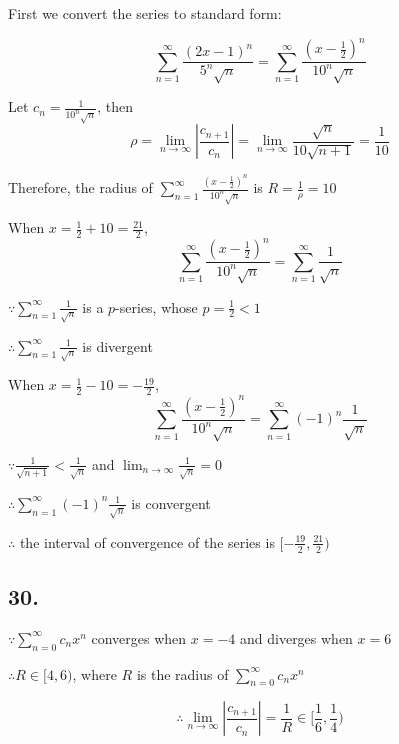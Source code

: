 \documentclass{article}
\begin{document}
    First we convert the series to standard form:

    $$\sum_{n=1}^\infty \frac{(2x-1)^n}{5^n \sqrt n} = \sum_{n=1}^\infty \frac{(x - \frac 1 2)^n}{10^n \sqrt n}$$

    Let $c_n = \frac{1}{10^n \sqrt n}$, then $$\rho = \lim_{n\to\infty}| \frac{c_{n+1}}{c_n} | = \lim_{n\to\infty} \frac{\sqrt{n}}{10\sqrt{n+1}} = \frac{1}{10}$$

    Therefore, the radius of $\sum_{n=1}^\infty \frac{(x - \frac 1 2)^n}{10^n \sqrt n}$ is $R = \frac{1}{\rho} = 10$

    When $x = \frac 1 2 + 10 = \frac{21}{2}$, $$\sum_{n=1}^\infty \frac{(x-\frac 1 2)^n}{10^n \sqrt n} = \sum_{n=1}^\infty \frac{1}{\sqrt n}$$

    $\because \sum_{n=1}^\infty \frac{1}{\sqrt n}$ is a $p$-series, whose $p = \frac 1 2 < 1$
    
    $\therefore \sum_{n=1}^\infty \frac{1}{\sqrt n}$ is divergent

    When $x = \frac 1 2 - 10 = -\frac{19}{2}$, $$\sum_{n=1}^\infty \frac{(x - \frac 1 2)^n}{10^n \sqrt n} = \sum_{n=1}^\infty (-1)^n \frac{1}{\sqrt n}$$

    $\because \frac{1}{\sqrt{n+1}} < \frac{1}{\sqrt n}$ and $\lim_{n\to\infty}\frac{1}{\sqrt n} = 0$

    $\therefore \sum_{n=1}^\infty (-1)^n \frac{1}{\sqrt n}$ is convergent

    $\therefore$ the interval of convergence of the series is $[-\frac{19}{2}, \frac{21}{2})$

    \subsection*{30.}

    $\because \sum_{n=0}^\infty c_nx^n$ converges when $x = -4$ and diverges when $x = 6$

    $\therefore R \in [4, 6)$, where $R$ is the radius of $\sum_{n=0}^\infty c_n x^n$ 

    $$\therefore \lim_{n\to\infty} | \frac{c_{n+1}}{c_n} | = \frac{1}{R} \in [\frac 1 6, \frac 1 4)$$
\end{document}
